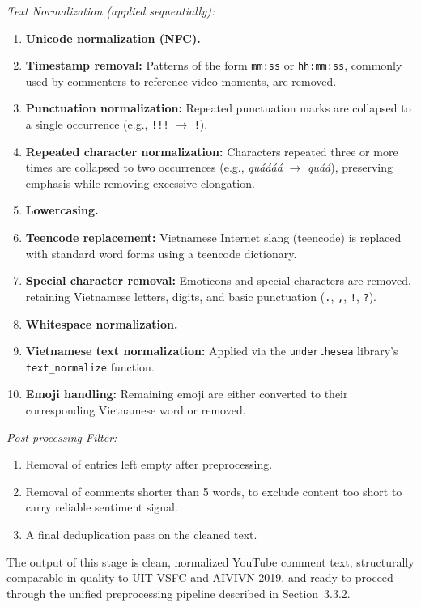 \documentclass[12pt]{report} %
\begin{document}
\textit{Text Normalization (applied sequentially):}
\begin{enumerate}
    \item \textbf{Unicode normalization (NFC).}
    \item \textbf{Timestamp removal:} Patterns of the form \texttt{mm:ss} or \texttt{hh:mm:ss}, commonly used by commenters to reference video moments, are removed.
    \item \textbf{Punctuation normalization:} Repeated punctuation marks are collapsed to a single occurrence (e.g., \texttt{!!!} $\rightarrow$ \texttt{!}).
    \item \textbf{Repeated character normalization:} Characters repeated three or more times are collapsed to two occurrences (e.g., \textit{quáááá} $\rightarrow$ \textit{quáá}), preserving emphasis while removing excessive elongation.
    \item \textbf{Lowercasing.}
    \item \textbf{Teencode replacement:} Vietnamese Internet slang (teencode) is replaced with standard word forms using a teencode dictionary.
    \item \textbf{Special character removal:} Emoticons and special characters are removed, retaining Vietnamese letters, digits, and basic punctuation (\texttt{.}, \texttt{,}, \texttt{!}, \texttt{?}).
    \item \textbf{Whitespace normalization.}
    \item \textbf{Vietnamese text normalization:} Applied via the \texttt{underthesea} library's \texttt{text\_normalize} function.
    \item \textbf{Emoji handling:} Remaining emoji are either converted to their corresponding Vietnamese word or removed.
\end{enumerate}

\textit{Post-processing Filter:}
\begin{enumerate}
    \item Removal of entries left empty after preprocessing.
    \item Removal of comments shorter than 5 words, to exclude content too short to carry reliable sentiment signal.
    \item A final deduplication pass on the cleaned text.
\end{enumerate}

The output of this stage is clean, normalized YouTube comment text, structurally comparable in quality to UIT-VSFC and AIVIVN-2019, and ready to proceed through the unified preprocessing pipeline described in Section~3.3.2.
\end{document}
